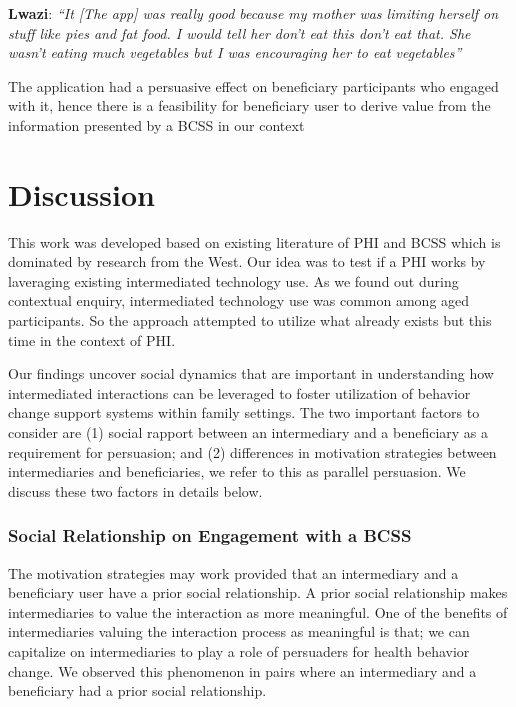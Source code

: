 \documentclass{sig-alternate}
\begin{document}
\textbf{Lwazi}: \textit{``It [The app] was really good because my 
mother was limiting herself on stuff like pies and fat food. I would tell 
her don't eat this don't eat that. She wasn't eating much vegetables but I 
was encouraging her to eat vegetables''}


The application had a persuasive effect on beneficiary participants who
engaged with it, hence there is a feasibility for beneficiary user to derive
value from the information presented by a BCSS in our context

\section{Discussion}

This work was developed based on existing literature of PHI and BCSS which is
dominated by research from the West. Our idea was to test if a PHI works by
laveraging existing intermediated technology use. As we found out during
contextual enquiry, intermediated technology use was common among aged
participants. So the approach attempted to utilize what already exists but
this time in the context of PHI.

Our findings uncover social dynamics that are important in understanding how
intermediated interactions can be leveraged to foster utilization of behavior
change support systems within family settings. The two important factors to
consider are (1) social rapport between an intermediary and a beneficiary as a
requirement for persuasion; and (2) differences in motivation strategies
between intermediaries and beneficiaries, we refer to this as parallel
persuasion.  We discuss these two factors in details below.

\subsubsection*{\textbf{Social Relationship on Engagement with a BCSS}}

The motivation strategies may work provided that an intermediary and a
beneficiary user have a prior social relationship. A prior social relationship
makes intermediaries to value the interaction as more meaningful. One of the
benefits of intermediaries valuing the interaction process as meaningful is
that; we can capitalize on intermediaries to play a role of persuaders for
health behavior change. We observed this phenomenon in pairs where an
intermediary and a beneficiary had a prior social relationship.
\end{document}
